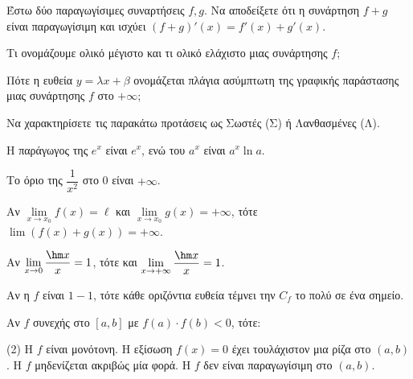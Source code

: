 \documentclass[11pt,a4paper]{article}
\newcommand{\kerkissans}[1]{{\fontfamily{maksf}\selectfont \textbf{#1}}}
\renewcommand{\textdexiakeraia}{}
\newcommand\themanum{A}
\newcounter{thema}[section]
\renewcommand{\thethema}{\arabic{thema}}
\newcommand{\Thema}{\refstepcounter{thema}{\textbf{\textcolor{black}{\faPenSquare\ \  \large \kerkissans{\textbf{\thethemaο\hspace{2mm}Διαγώνισμα - Θέμα \themanum}}}}}\hspace{0mm}}{}
\newenvironment{thema}[1]
{\begin{tcolorbox}[title=\Thema\kerkissans{\textbf{\large{  #1}}},breakable,
enhanced standard,titlerule=0pt,toprule=0pt, rightrule=0pt, bottomrule=0pt,
colback=white,left=0mm,top=1mm,bottom=0mm,
boxrule=0pt,
colframe=white,leftrule=0mm,sharp corners,coltitle=black]
\renewcommand{\themanum}{#1}}
{\end{tcolorbox}}
\begin{document}
\begin{thema}{A}
\begin{erwthma}
    \item Έστω δύο παραγωγίσιμες συναρτήσεις $f, g$. Να αποδείξετε ότι η συνάρτηση $f+g$ είναι παραγωγίσιμη και ισχύει $(f+g)'(x) = f'(x) + g'(x)$.
    \item Τι ονομάζουμε ολικό μέγιστο και τι ολικό ελάχιστο μιας συνάρτησης $f$;
    \item Πότε η ευθεία $y=\lambda x+\beta$ ονομάζεται πλάγια ασύμπτωτη της γραφικής παράστασης μιας συνάρτησης $f$ στο $+\infty$;
    \item Να χαρακτηρίσετε τις παρακάτω προτάσεις ως Σωστές (Σ) ή Λανθασμένες (Λ).
    \begin{alist}
        \item Η παράγωγος της $e^x$ είναι $e^x$, ενώ του $a^x$ είναι $a^x \ln a$.
        \item Το όριο της $\dfrac{1}{x^2}$ στο 0 είναι $+\infty$.
        \item Αν $\lim\limits_{x\to x_0} f(x) = \ell$ και $\lim\limits_{x\to x_0} g(x) = +\infty$, τότε $\lim (f(x)+g(x)) = +\infty$.
        \item Αν $\lim\limits_{x \to 0} \dfrac{\hm x}{x} = 1$, τότε και $\lim\limits_{x \to +\infty} \dfrac{\hm x}{x} = 1$.
        \item Αν η $f$ είναι $1-1$, τότε κάθε οριζόντια ευθεία τέμνει την $C_f$ το πολύ σε ένα σημείο.
    \end{alist}
    \item Αν $f$ συνεχής στο $[a,b]$ με $f(a) \cdot f(b) < 0$, τότε:
    \begin{tasks}[label=\let\textdexiakeraia\relax\alph*.](2)
        \task Η $f$ είναι μονότονη.
        \task Η εξίσωση $f(x) = 0$ έχει τουλάχιστον μια ρίζα στο $(a,b)$.
        \task Η $f$ μηδενίζεται ακριβώς μία φορά.
        \task Η $f$ δεν είναι παραγωγίσιμη στο $(a,b)$.
    \end{tasks}
\end{erwthma}
\end{thema}
\vspace{1cm}
\end{document}
